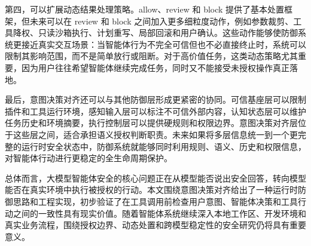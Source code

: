 第四，可以扩展动态结果处理策略。allow、review 和 block 提供了基本处置框架，但未来可以在 review 和 block 之间加入更多细粒度动作，例如参数裁剪、工具降权、只读沙箱执行、计划重写、局部回滚和用户确认。这些动作能够使防御系统更接近真实交互场景：当智能体行为不完全可信但也不必直接终止时，系统可以限制其影响范围，而不是简单放行或阻断。对于高价值任务，这类动态策略尤其重要，因为用户往往希望智能体继续完成任务，同时又不能接受未授权操作真正落地。

最后，意图决策对齐还可以与其他防御层形成更紧密的协同。可信基座层可以限制插件和工具运行环境，感知输入层可以标注不可信外部内容，认知状态层可以维护任务历史和环境摘要，执行控制层可以提供硬规则和权限边界。意图决策对齐层位于这些层之间，适合承担语义授权判断职责。未来如果将多层信息统一到一个更完整的运行时安全状态中，防御系统就能够同时利用规则、语义、历史和权限信息，对智能体行动进行更稳定的全生命周期保护。

总体而言，大模型智能体安全的核心问题正在从模型能否说出安全回答，转向模型能否在真实环境中执行被授权的行动。本文围绕意图决策对齐给出了一种运行时防御思路和工程实现，初步验证了在工具调用前检查用户意图、智能体决策和工具行动之间的一致性具有现实价值。随着智能体系统继续深入本地工作区、开发环境和真实业务流程，围绕授权边界、动态处置和跨模型稳定性的安全研究仍将具有重要意义。
